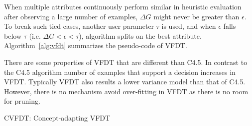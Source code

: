 When multiple attributes continuously perform similar in heuristic evaluation after observing a large number of examples, $\Delta G$ might never be greater than $\epsilon$. To break such tied cases, another user parameter $\tau$ is used, and when $\epsilon$ falls below $\tau$ (i.e. $\Delta G < \epsilon <\tau$), algorithm splits on the best attribute. Algorithm~\ref{alg:vfdt} summarizes the pseudo-code of VFDT.

There are some properties of VFDT that are different than C4.5. In contrast to the C4.5 algorithm number of examples that support a decision increases in VFDT. Typically VFDT also results a lower variance model than that of C4.5. However, there is no mechanism avoid over-fitting in VFDT as there is no room for pruning.

\begin{algorithm}[htbp]
    \DontPrintSemicolon
      
    \caption{CVFDT: Concept-adapting VFDT}
    \label{alg:cvfdt}
    
    
\end{algorithm}
